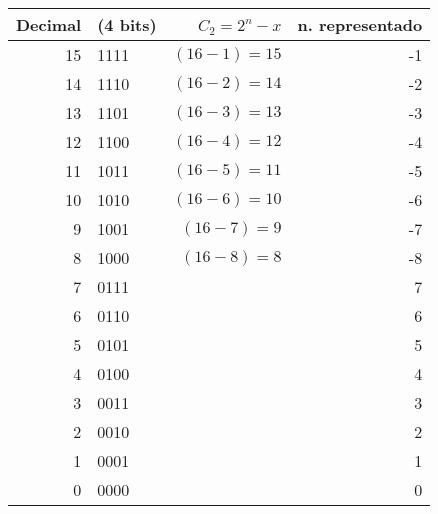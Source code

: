  \begin{table}
 \centering
 \begin{tabular}{r  l  r  r}
 Decimal&  (4 bits) &\ $C_2=2^n-x$ & n. representado\\
 \hline
15& 1111&$(16-1)=15$&-1\\
14& 1110&$(16-2)=14$&-2\\
13& 1101&$(16-3)=13$&-3\\
12& 1100&$(16-4)=12$&-4\\
11& 1011&$(16-5)=11$&-5\\
10& 1010&$(16-6)=10$&-6\\
9& 1001& $(16- 7)=9$&-7\\
8& 1000& $(16-8)=8$&-8\\
\hline
\hline
7& 0111& & 7\\
6& 0110& & 6\\
5& 0101& & 5\\
4& 0100& & 4\\
3& 0011& & 3\\
2& 0010& & 2\\
1& 0001& & 1\\
0& 0000& & 0\\
\hline
\end{tabular}
\label{tabla:c2}
 \end{table}
 
